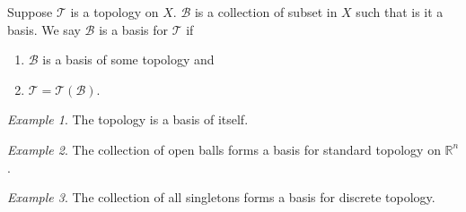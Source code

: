 \documentclass[article,11pt, reqno]{article}
\theoremstyle{remark}
\newtheorem*{example}{Example}
\newcommand{\mb}{\mathbb}
\newcommand{\mc}{\mathcal}
\newcommand{\<}{\langle}
\renewcommand{\>}{\rangle}
\begin{document}
Suppose $\mc T$ is a topology on $X$. $\mc B$ is a collection of subset in $X$ such that is it a basis. We say $\mc B$ is a basis for $\mc T$ if
\begin{enumerate}
    \item $\mc B$ is a basis of some topology and
    \item $\mc T=\mc T(\mc B)$.
\end{enumerate}
\begin{example}
    The topology is a basis of itself.
\end{example}
\begin{example}
    The collection of open balls forms a basis for standard topology on $\mb R^n$.
\end{example}
\begin{example}
    The collection of all singletons forms a basis for discrete topology.
\end{example}
\end{document}
